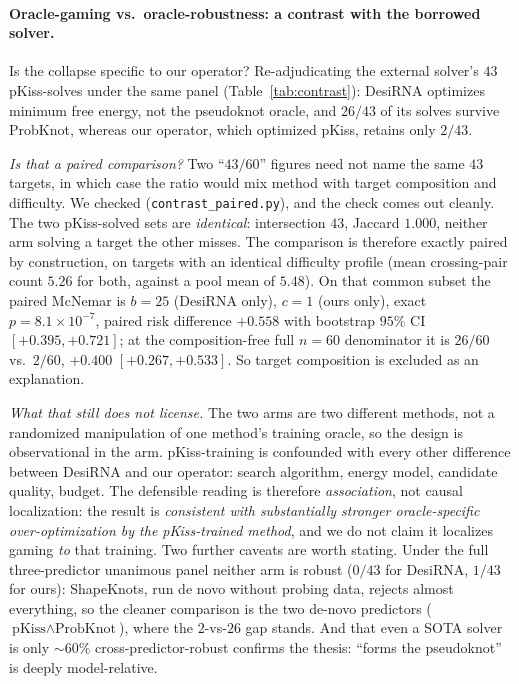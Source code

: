 \documentclass[11pt]{article}
\begin{document}
\paragraph{Oracle-gaming vs.\ oracle-robustness: a contrast with the borrowed solver.} Is the collapse
specific to our operator? Re-adjudicating the external solver's $43$ pKiss-solves under the same panel
(Table~\ref{tab:contrast}): DesiRNA optimizes minimum free energy, not the pseudoknot oracle, and $26/43$ of
its solves survive ProbKnot, whereas our operator, which optimized pKiss, retains only $2/43$.

\emph{Is that a paired comparison?} Two ``$43/60$'' figures need not name the same $43$ targets, in which case
the ratio would mix method with target composition and difficulty. We checked (\texttt{contrast\_paired.py}), and the check comes out cleanly. The two pKiss-solved sets are
\emph{identical}: intersection $43$, Jaccard $1.000$, neither arm solving a target the other misses. The
comparison is therefore exactly paired by construction, on targets with an identical difficulty profile (mean crossing-pair
count $5.26$ for both, against a pool mean of $5.48$). On that common subset the paired McNemar is
$b{=}25$ (DesiRNA only), $c{=}1$ (ours only), exact $p{=}8.1\!\times\!10^{-7}$, paired risk difference
${+}0.558$ with bootstrap $95\%$ CI $[{+}0.395,{+}0.721]$; at the composition-free full $n{=}60$ denominator it
is $26/60$ vs.\ $2/60$, ${+}0.400$ $[{+}0.267,{+}0.533]$. So target composition is excluded as an explanation.

\emph{What that still does not license.} The two arms are two different methods, not a randomized manipulation of one method's training oracle, so the
design is observational in the arm. pKiss-training is confounded with every other difference between DesiRNA and
our operator: search algorithm, energy model, candidate quality, budget. The defensible reading is therefore \emph{association}, not causal localization:
the result is \emph{consistent with substantially stronger oracle-specific over-optimization by the
pKiss-trained method}, and we do not claim it localizes gaming \emph{to} that training. Two further caveats are worth stating.
Under the full three-predictor unanimous panel neither arm is robust ($0/43$
for DesiRNA, $1/43$ for ours): ShapeKnots, run de novo without probing data, rejects almost everything, so
the cleaner comparison is the two de-novo predictors ($\text{pKiss}\wedge\text{ProbKnot}$), where the
$2$-vs-$26$ gap stands. And that even a SOTA solver is only $\sim\!60\%$ cross-predictor-robust confirms the
thesis: ``forms the pseudoknot'' is deeply model-relative.
\end{document}
